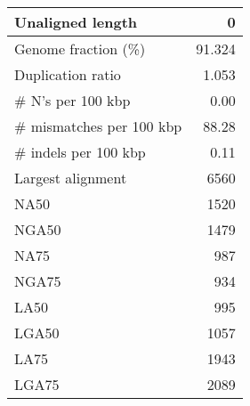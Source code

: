 \documentclass[12pt,a4paper]{article}
\begin{document}
\begin{table}[ht]
\begin{center}
\begin{tabular}{|l*{1}{|r}|}
Unaligned length & 0 \\ \hline
Genome fraction (\%) & 91.324 \\ \hline
Duplication ratio & 1.053 \\ \hline
\# N's per 100 kbp & 0.00 \\ \hline
\# mismatches per 100 kbp & 88.28 \\ \hline
\# indels per 100 kbp & 0.11 \\ \hline
Largest alignment & 6560 \\ \hline
NA50 & 1520 \\ \hline
NGA50 & 1479 \\ \hline
NA75 & 987 \\ \hline
NGA75 & 934 \\ \hline
LA50 & 995 \\ \hline
LGA50 & 1057 \\ \hline
LA75 & 1943 \\ \hline
LGA75 & 2089 \\ \hline
\end{tabular}
\end{center}
\end{table}
\end{document}
